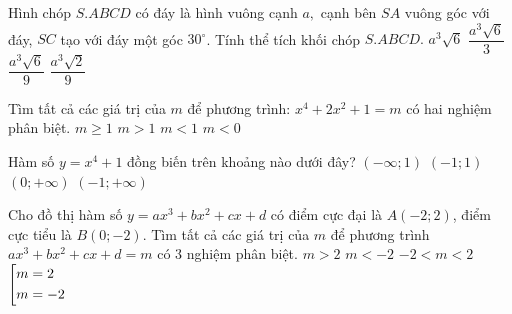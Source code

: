 \begin{ex}%
	Hình chóp $ S.ABCD $ có đáy là hình vuông cạnh $ a, $ cạnh bên $ SA $ vuông góc với đáy, $ SC $ tạo với đáy một góc $ 30^ \circ $. Tính thể tích khối chóp $ S.ABCD. $
	\choice
	{$ a^3 \sqrt{6} $}
			{$  \dfrac{a^3 \sqrt{6}}{3} $}
				{\True $ \dfrac{a^3 \sqrt{6}}{9} $}
					{$ \dfrac{a^3 \sqrt{2}}{9} $}
\end{ex}
\begin{ex}%
	Tìm tất cả các giá trị của $ m $ để phương trình: $ x^4 + 2x^2 + 1 = m $ có hai nghiệm phân biệt.
	\choice
	{$ m \geq 1 $}
	{\True $ m > 1 $}
	{$ m < 1 $}
	{$ m < 0 $ }
	
\end{ex}
\begin{ex}%
	Hàm số $ y = x^4 + 1 $ đồng biến trên khoảng nào dưới đây?
	\choice
	{$ \left(- \infty; 1\right) $}
	{$ \left(- 1; 1\right) $}
	{\True $ \left(0; + \infty \right) $}
	{$ \left(- 1; +\infty \right) $}
	
\end{ex}
\begin{ex}%
Cho đồ thị hàm số $ y = ax^3 + bx^2 + cx + d $	có điểm cực đại là $ A \left(-2;2\right) $, điểm cực tiểu là $ B \left( 0;-2 \right) $. Tìm tất cả các giá trị của $ m $ để phương trình $ ax^3 + bx^2 + cx + d = m $ có 3 nghiệm phân biệt.
	\choice
	{ $ m > 2 $}
	{$ m < -2 $}
	{\True $ - 2 < m < 2 $}
	{$ \left[\begin{aligned}m &= 2 \\ m &= -2\end{aligned}\right. $ }
\end{ex}
